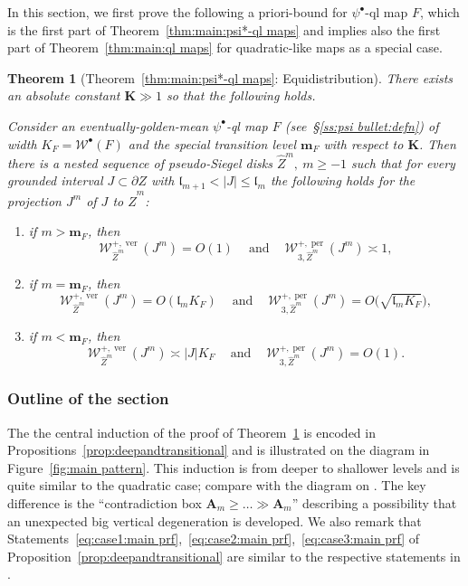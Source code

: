\documentclass{amsart}
\renewcommand{\sp}{{\ \ }}
\newcommand{\1}{{\mathbb 1 }}
\newcommand{\Width}{{\mathcal W}}
\newcommand{\bA}{{\mathbf{A}}}
\newcommand{\wZ}{{\widehat Z}}
\newcommand{\bK}{{\mathbf K}}
\newcommand{\bbm}{{\mathbf m}}
\newcommand{\length}{{\mathfrak l}}
\newcommand\ver{{\operatorname{ver}}}
\newcommand\per{{\operatorname{per}}}
\newtheorem{thm}{Theorem}[section]
\theoremstyle{remark}
\numberwithin{equation}{section}
\theoremstyle{definition}
\begin{document}
In this section, we first prove the following a priori-bound for $\psi^\bullet$-ql map $F$, which is the first part of Theorem~\ref{thm:main:psi*-ql maps} and implies also the first part of Theorem~\ref{thm:main:ql maps} for quadratic-like maps as a special case.
\begin{thm}[Theorem~\ref{thm:main:psi*-ql maps}: Equidistribution]\label{thm:main:psi-ql maps}
There exists an absolute constant $\bK\gg 1$ so that the following holds.

Consider an eventually-golden-mean $\psi^\bullet$-ql map $F$ (see~\S\ref{ss:psi bullet:defn}) of width $K_F= \Width^\bullet(F)$ and the special transition level $\bbm_F$ with respect to $\bK$. Then there is a nested sequence of pseudo-Siegel disks $\wZ^m,\  m\ge -1$ such that for every grounded interval $J\subset \partial Z$ with $\length_{m+1}< |J|\le \length_{m}$ the following holds for the projection $J^m$ of $J$ to $\wZ^m$:
\begin{enumerate}[ label=(\Alph*)]
    \item \label{thm:apbs:A} if $m> \bbm_F$, then \[\Width_{\wZ^m}^{+,\ver} (J^m)=O(1) \sp\sp\text{ and }\sp\sp \Width_{3,\wZ^m}^{+,\per} (J^m)\asymp 1,\]
    \item\label{thm:apbs:B} if $m= \bbm_F$, then 
    \[\Width_{\wZ^m}^{+,\ver} (J^m)= O(\length_m K_F)  \sp\sp\text{ and }\sp\sp \Width_{3,\wZ^m}^{+,\per} (J^m)=O\big(\sqrt{\length_m K_F }\big),\]
        \item \label{thm:apbs:C} if $m< \bbm_F$, then 
    \[\Width_{\wZ^m}^{+,\ver} (J^m)\asymp |J|K_F  \sp\sp\text{ and }\sp\sp \Width_{3,\wZ^m}^{+,\per} (J^m)=O(1).\]
\end{enumerate}
\end{thm}



\subsubsection{Outline of the section}
\label{ss:Proof:outline} The the central induction of the proof of Theorem~\ref{thm:main:psi-ql maps} is encoded in Propositions~\ref{prop:deepandtransitional} and is illustrated on the diagram in Figure~\ref{fig:main pattern}. This induction is from deeper to shallower levels and is quite similar to the quadratic case; compare with the diagram on \cite[Figure 27]{DL22}. The key difference is the ``contradiction box $\bA_m \ge \dots \gg \bA_m$'' describing a possibility that an unexpected big vertical degeneration is developed. We also remark that Statements~\ref{eq:case1:main prf},~\ref{eq:case2:main prf},~\ref{eq:case3:main prf} of Proposition~\ref{prop:deepandtransitional} are similar to the respective statements in \cite[\S10.0.1]{DL22}.
\end{document}
